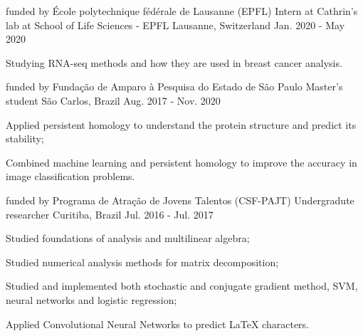 

\begin{cventries}

  \cventry
    {funded by École polytechnique fédérale de Lausanne (EPFL)}
    {Intern at Cathrin's lab at School of Life Sciences - EPFL}
    {Lausanne, Switzerland} 
    {Jan. 2020 - May 2020} 
    {
      \begin{cvitems} 
        \item {Studying RNA-seq methods and how they are used 
              in breast cancer analysis.}
      \end{cvitems} 
    }
  \cventry
    {funded by Fundação de Amparo à Pesquisa do Estado de São Paulo} %
    {Master's student} %
    {São Carlos, Brazil} %
    {Aug. 2017 - Nov. 2020} %
    {
      \begin{cvitems} %
        \item {Applied persistent homology to understand the protein structure
        and predict its stability;}
        \item {Combined machine learning and persistent homology to improve
        the accuracy in image classification problems.}
      \end{cvitems}
    }

\cventry
  {funded by Programa de Atração de Jovens Talentos (CSF-PAJT)} %
  {Undergradute researcher} %
  {Curitiba, Brazil} %
  {Jul. 2016 - Jul. 2017} %
  {
    \begin{cvitems} %
      \item {Studied foundations of analysis and multilinear algebra;}
      \item {Studied numerical analysis methods for matrix decomposition;}
      \item {Studied and implemented both stochastic and conjugate gradient
      method, SVM, neural networks and logistic regression;}
      \item {Applied Convolutional Neural Networks to predict LaTeX characters.}
    \end{cvitems}
  }

\end{cventries}
